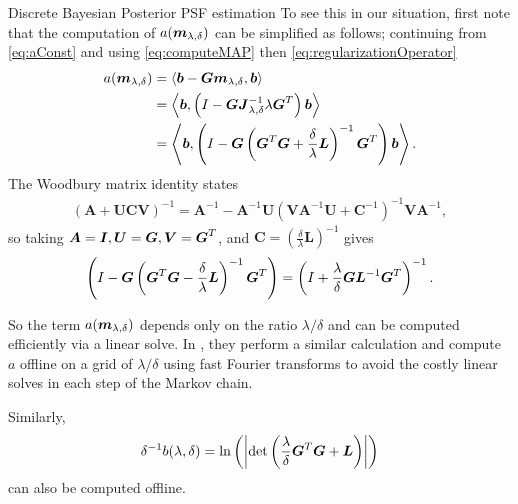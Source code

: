 \begin{chapter}{Discrete Bayesian Posterior PSF estimation}
To see this in our situation, first note that the computation of $a(\mbox{\boldmath$m$}_{\lambda,\delta})$ can be simplified as follows; continuing from \eqref{eq:aConst} and using \eqref{eq:computeMAP} then \eqref{eq:regularizationOperator}
\begin{align}
  a(\mbox{\boldmath$m$}_{\lambda,\delta}) 
    &= \left\langle\mbox{\boldmath$b$} - \mbox{\boldmath$G$}\mbox{\boldmath$m$}_{\lambda,\delta},\mbox{\boldmath$b$}\right\rangle\nonumber\\
    &=  \left\langle\mbox{\boldmath$b$},\left(I - \mbox{\boldmath$G$}  \mbox{\boldmath$J$}_{\lambda,\delta}^{-1}\lambda\mbox{\boldmath$G$}^T\right) \mbox{\boldmath$b$}\right\rangle\nonumber\\
    &= \left\langle \mbox{\boldmath$b$},\left( I - \mbox{\boldmath$G$}  \left( \mbox{\boldmath$G$}^T\mbox{\boldmath$G$} + \frac{\delta}{\lambda}\mbox{\boldmath$L$} \right)^{-1}\mbox{\boldmath$G$}^T \right)\mbox{\boldmath$b$} \right\rangle. 
\end{align}
The Woodbury matrix identity \citep{woodbury1950inverting} states
\begin{align}
  (\bm A + \bm U\bm C\bm V)^{-1} = \bm A^{-1} - \bm A^{-1}\bm U\left(\bm V\bm A^{-1}\bm U + \bm C^{-1}\right)^{-1}\bm V\bm A^{-1},
\end{align}
so taking $\mbox{\boldmath$A$} = \mbox{\boldmath$I$},\mbox{\boldmath$U$}=\mbox{\boldmath$G$}, \mbox{\boldmath$V$}=\mbox{\boldmath$G$}^T$, and $\bm C= \left(\frac\delta \lambda\bm L\right)^{-1}$ gives
\begin{equation}
  \left(I - \mbox{\boldmath$G$}  \left(\mbox{\boldmath$G$}^T\mbox{\boldmath$G$} - \frac{\delta}{\lambda}\mbox{\boldmath$L$}\right)^{-1}\mbox{\boldmath$G$}^T\right)
  = \left(I + \frac \lambda\delta \mbox{\boldmath$G$}\mbox{\boldmath$L$}^{-1}\mbox{\boldmath$G$}^T\right)^{-1}.
\end{equation}

So the term $a(\mbox{\boldmath$m$}_{\lambda,\delta})$ depends only on the ratio $\lambda/\delta$ and can be computed efficiently via a linear solve.
In \citep{fox2015fast}, they perform a similar calculation and compute $a$ offline on a grid of $\lambda/\delta$ using fast Fourier transforms to avoid the costly linear solves in each step of the Markov chain.

Similarly, 
\begin{equation}
  \delta^{-1}b(\lambda,\delta) = \ln\left(\left|\det\left(\frac \lambda\delta \mbox{\boldmath$G$}^T\mbox{\boldmath$G$} + \mbox{\boldmath$L$}\right)\right|\right)
\end{equation}
can also be computed offline.  


\end{chapter}
